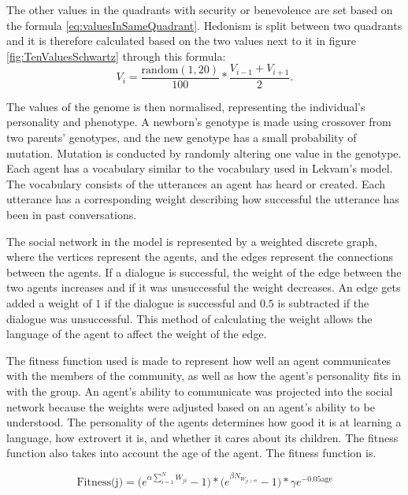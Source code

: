 The other values in the quadrants with security or benevolence are set based on the formula \ref{eq:valuesInSameQuadrant}. Hedonism is split between two quadrants and it is therefore calculated based on the two values next to it in figure \ref{fig:TenValuesSchwartz} through this formula:
\begin{equation}\label{eq:hedonism}
V_{i} = \frac{\mathrm{random}(1, 20)}{100} \ast \frac{V_{i-1} + V_{i+1}}{2}.
\end{equation}

The values of the genome is then normalised, representing the individual’s personality and phenotype. A newborn’s genotype is made using crossover from two parents' genotypes, and the new genotype has a small probability of mutation. Mutation is conducted by randomly altering one value in the genotype. Each agent has a vocabulary similar to the vocabulary used in Lekvam’s model. The vocabulary consists of the utterances an agent has heard or created. Each utterance has a corresponding weight describing how successful the utterance has been in past conversations.

The social network in the model is represented by a weighted discrete graph, where the vertices represent the agents, and the edges represent the connections between the agents. If a dialogue is successful, the weight of the edge between the two agents increases and if it was unsuccessful the weight decreases. An edge gets added a weight of $1$ if the dialogue is successful and $0.5$ is subtracted if the dialogue was unsuccessful. This method of calculating the weight allows the language of the agent to affect the weight of the edge.
 
The fitness function used is made to represent how well an agent communicates with the members of the community, as well as how the agent’s personality fits in with the group. An agent's ability to communicate was projected into the social network because the weights were adjusted based on an agent’s ability to be understood. The personality of the agents determines how good it is at learning a language, how extrovert it is, and whether it cares about its children. The fitness function also takes into account the age of the agent. The fitness function is.

\begin{equation}\label{eq:Fitness}
\text{Fitness(j)} = \Big( e^{\alpha \sum_{i=1}^{N}{W_{ji}}}-1 \Big) \ast \Big( e^{\beta N_{W_{ji \geq \Theta}}}-1 \Big) \ast \gamma e^{-0.05 \text{age}}
\end{equation}

